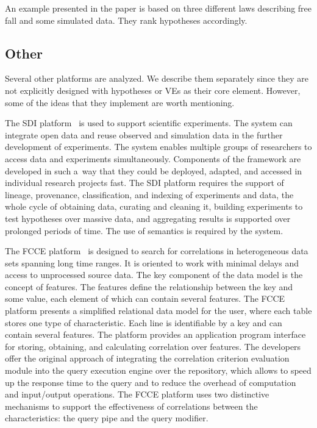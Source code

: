 \begin{multicols}{2}
      An example presented in the paper is based on three different laws describing 
free fall and some simulated data. They rank hypotheses accordingly.

\vspace*{-9pt}

\subsection{Other}

\vspace*{-2pt}

      \noindent
      Several other platforms are analyzed. We describe them separately since they 
are not explicitly designed with hypotheses or VEs as their core 
element. However, some of the ideas that they implement are worth mentioning.
      
      The SDI platform~\cite{5-tar} is used to support scientific experiments. The 
system can integrate open data and reuse observed and simulation data in the further 
development of experiments. The system enables multiple groups of researchers to 
access data and experiments simultaneously. Components of the framework are 
developed in such a~way that they could be deployed, adapted, and accessed in 
individual research projects fast. The SDI platform requires the support of lineage, provenance, 
classification, and indexing of experiments and data, the whole cycle of obtaining data, 
curating and cleaning it, building experiments to test hypotheses over massive data, 
and aggregating results is supported over prolonged periods of time. The use of semantics 
is required by the system.
      
      The FCCE platform~\cite{10-tar} is designed to search for correlations in 
heterogeneous data sets spanning long time ranges. It is oriented to work with 
minimal delays and access to unprocessed source data. The key component of the 
data model is the concept of features. The features define the relationship between the 
key and some value, each element of which can contain several features. The FCCE platform
presents a simplified relational data model for the user, where each table stores one 
type of characteristic. Each line is identifiable by a key and can contain several 
features. The platform provides an application program interface
 for storing, obtaining, and calculating 
correlation over features. The developers offer the original approach of integrating 
the correlation criterion evaluation module into the query execution engine over the 
repository, which allows to speed up the response time to the query and to reduce the 
overhead of computation and input/output operations. The FCCE platform
uses two distinctive mechanisms 
to support the effectiveness of correlations between the characteristics: the query pipe 
and the query modifier.


\end{multicols}
